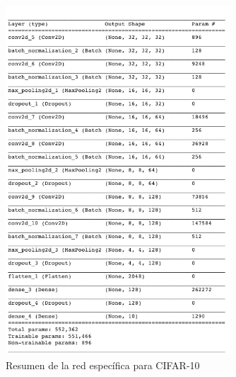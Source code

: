 \begin{figure}[h!]
    \centering
    \includegraphics[width=0.75\textwidth]{images/model_details/cifar_summary.png}
    \caption{Resumen de la red específica para CIFAR-10 \cite{cifar_nb}}
    \label{cifar summary}
\end{figure}